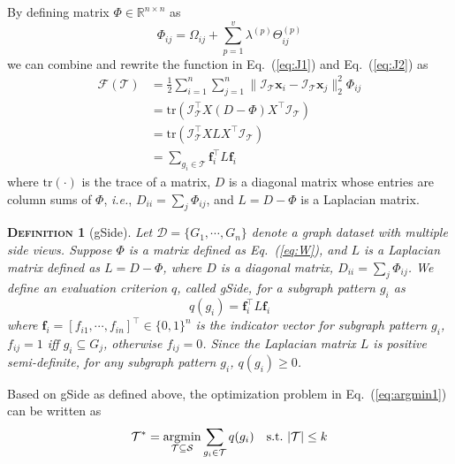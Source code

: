 \documentclass[conference]{IEEEtran}
\newcommand{\gscore}[0]{gSide}
\newtheorem{Definition}{\textsc{Definition}}
\begin{document}
By defining matrix $\Phi\in\mathbb{R}^{n\times n}$ as
\begin{equation}
\Phi_{ij}=\Omega_{ij}+\sum_{p=1}^v\lambda^{(p)}\Theta^{(p)}_{ij}
\label{eq:W}
\end{equation}
we can combine and rewrite the function in Eq.~(\ref{eq:J1}) and Eq.~(\ref{eq:J2}) as
\begin{equation}
\begin{split}
\mathcal{F}(\mathcal{T})&=\frac{1}{2}\sum_{i=1}^n\sum_{j=1}^n
    \|\mathcal{I}_\mathcal{T}\mathbf{x}_i-\mathcal{I}_\mathcal{T}\mathbf{x}_j\|^2_2\Phi_{ij}\\
&=\text{tr}(\mathcal{I}^{\top}_\mathcal{T}X(D-\Phi)X^{\top}\mathcal{I}_\mathcal{T})\\
&=\text{tr}(\mathcal{I}^{\top}_\mathcal{T}XLX^{\top}\mathcal{I}_\mathcal{T})\\
&=\sum_{g_i\in\mathcal{T}}\mathbf{f}_i^\top L\mathbf{f}_i
\label{eq:J}
\end{split}
\end{equation}
where $\text{tr}(\cdot)$ is the trace of a matrix, $D$ is a diagonal matrix whose entries are column sums of $\Phi$, \emph{i.e.}, $D_{ii}=\sum_{j}\Phi_{ij}$, and $L=D-\Phi$ is a Laplacian matrix.

\begin{Definition}[\gscore]\label{def:q}
Let $\mathcal{D}=\{G_1,\cdots,G_n\}$ denote a graph dataset with multiple side views. Suppose $\Phi$ is a matrix defined as Eq.~(\ref{eq:W}), and $L$ is a Laplacian matrix defined as $L=D-\Phi$, where $D$ is a diagonal matrix, $D_{ii}=\sum_{j}\Phi_{ij}$. We define an evaluation criterion $q$, called {\gscore}, for a subgraph pattern $g_i$ as
\begin{equation}
q(g_i)=\mathbf{f}_i^\top L\mathbf{f}_i
\label{eq:q}
\end{equation}
where $\mathbf{f}_i=[f_{i1},\cdots,f_{in}]^\top\in\{0,1\}^n$ is the indicator vector for subgraph pattern $g_i$, $f_{ij}=1$ iff $g_i\subseteq G_j$, otherwise $f_{ij}=0$. Since the Laplacian matrix $L$ is positive semi-definite, for any subgraph pattern $g_i$, $q(g_i)\ge0$.
\end{Definition}

Based on {\gscore} as defined above, the optimization problem in Eq.~(\ref{eq:argmin1}) can be written as
\begin{equation}
\mathcal{T}^*=\operatornamewithlimits{argmin}_{\mathcal{T}\subseteq\mathcal{S}}\sum_{g_i\in\mathcal{T}}q(g_i)~~~\text{s.t.}~|\mathcal{T}|\le k
\label{eq:argmin2}
\end{equation}
\end{document}
